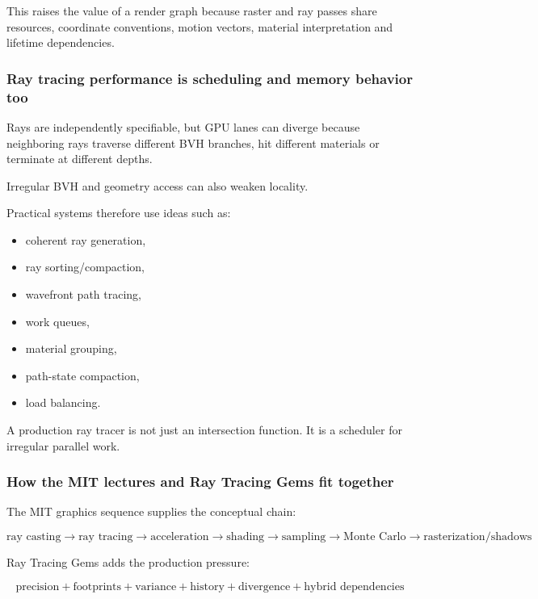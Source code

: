 This raises the value of a render graph because raster and ray passes share resources, coordinate conventions, motion vectors, material interpretation and lifetime dependencies.

\subsubsection{Ray tracing performance is scheduling and memory behavior too}\label{03-visual-computing-i-ch001-ray-tracing-performance-is-scheduling-and-memory-behavior-too}

Rays are independently specifiable, but GPU lanes can diverge because neighboring rays traverse different BVH branches, hit different materials or terminate at different depths.

Irregular BVH and geometry access can also weaken locality.

Practical systems therefore use ideas such as:

\begin{itemize}
\tightlist
\item
  coherent ray generation,
\item
  ray sorting/compaction,
\item
  wavefront path tracing,
\item
  work queues,
\item
  material grouping,
\item
  path-state compaction,
\item
  load balancing.
\end{itemize}

A production ray tracer is not just an intersection function. It is a scheduler for irregular parallel work.

\subsubsection{How the MIT lectures and Ray Tracing Gems fit together}\label{03-visual-computing-i-ch001-how-the-mit-lectures-and-ray-tracing-gems-fit-together}

The MIT graphics sequence supplies the conceptual chain:

\[
\text{ray casting}
\rightarrow
\text{ray tracing}
\rightarrow
\text{acceleration}
\rightarrow
\text{shading}
\rightarrow
\text{sampling}
\rightarrow
\text{Monte Carlo}
\rightarrow
\text{rasterization/shadows}
\]

Ray Tracing Gems adds the production pressure:

\[
\boxed{
\text{precision}
+
\text{footprints}
+
\text{variance}
+
\text{history}
+
\text{divergence}
+
\text{hybrid dependencies}
}
\]

